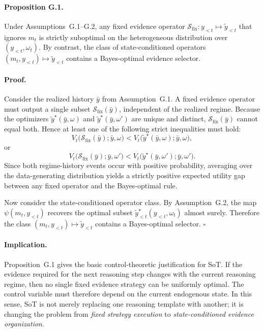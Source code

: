 \paragraph{Proposition G.1.}
Under Assumptions~G.1--G.2, any fixed evidence operator
\(\mathcal{S}_{\mathrm{fix}}: y_{<t}\mapsto \widetilde y_{<t}\)
that ignores \(m_t\) is strictly suboptimal on the heterogeneous distribution over \((y_{<t},\omega_t)\).
By contrast, the class of state-conditioned operators
\((m_t,y_{<t})\mapsto \widetilde y_{<t}\)
contains a Bayes-optimal evidence selector.

\paragraph{Proof.}
Consider the realized history \(\bar y\) from Assumption~G.1.
A fixed evidence operator must output a single subset
\(\mathcal{S}_{\mathrm{fix}}(\bar y)\),
independent of the realized regime.
Because the optimizers
\(\widetilde y^{\star}(\bar y,\omega)\)
and
\(\widetilde y^{\star}(\bar y,\omega')\)
are unique and distinct, \(\mathcal{S}_{\mathrm{fix}}(\bar y)\) cannot equal both.
Hence at least one of the following strict inequalities must hold:
\begin{equation}
V_t\!\bigl(\mathcal{S}_{\mathrm{fix}}(\bar y);\bar y,\omega\bigr)
<
V_t\!\bigl(\widetilde y^{\star}(\bar y,\omega);\bar y,\omega\bigr),
\label{eq:app_fix_gap_1}
\end{equation}
or
\begin{equation}
V_t\!\bigl(\mathcal{S}_{\mathrm{fix}}(\bar y);\bar y,\omega'\bigr)
<
V_t\!\bigl(\widetilde y^{\star}(\bar y,\omega');\bar y,\omega'\bigr).
\label{eq:app_fix_gap_2}
\end{equation}
Since both regime-history events occur with positive probability, averaging over the data-generating distribution yields a strictly positive expected utility gap between any fixed operator and the Bayes-optimal rule.

Now consider the state-conditioned operator class.
By Assumption~G.2, the map
\(\psi(m_t,y_{<t})\)
recovers the optimal subset
\(\widetilde y_{<t}^{\star}(y_{<t},\omega_t)\)
almost surely.
Therefore the class
\((m_t,y_{<t})\mapsto \widetilde y_{<t}\)
contains a Bayes-optimal selector.
\hfill\(\square\)

\paragraph{Implication.}
Proposition~G.1 gives the basic control-theoretic justification for SoT.
If the evidence required for the next reasoning step changes with the current reasoning regime, then no single fixed evidence strategy can be uniformly optimal.
The control variable must therefore depend on the current endogenous state.
In this sense, SoT is not merely replacing one reasoning template with another; it is changing the problem from \emph{fixed strategy execution} to \emph{state-conditioned evidence organization}.

